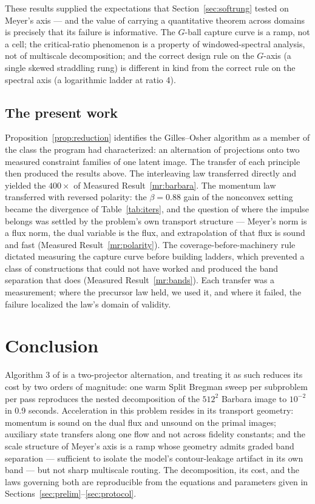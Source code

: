 \documentclass[11pt]{article}
\theoremstyle{definition}
\begin{document}
These results supplied the expectations that Section~\ref{sec:softrung}
tested on Meyer's axis --- and the value of carrying a quantitative theorem
across domains is precisely that its failure is informative. The $G$-ball
capture curve is a ramp, not a cell; the critical-ratio phenomenon is a
property of windowed-spectral analysis, not of multiscale decomposition;
and the correct design rule on the $G$-axis (a single skewed straddling
rung) is different in kind from the correct rule on the spectral axis (a
logarithmic ladder at ratio 4).

\subsection{The present work}

Proposition~\ref{prop:reduction} identifies the Gilles--Osher algorithm as
a member of the class the program had characterized: an alternation of
projections onto two measured constraint families of one latent image. The
transfer of each principle then produced the results above. The
interleaving law transferred directly and yielded the $400\times$ of
Measured Result~\ref{mr:barbara}. The momentum law transferred with
reversed polarity: the $\beta=0.88$ gain of the nonconvex setting became
the divergence of Table~\ref{tab:iters}, and the question of where the
impulse belongs was settled by the problem's own transport structure ---
Meyer's norm is a flux norm, the dual variable is the flux, and
extrapolation of that flux is sound and fast (Measured
Result~\ref{mr:polarity}). The coverage-before-machinery rule dictated
measuring the capture curve before building ladders, which prevented a
class of constructions that could not have worked and produced the band
separation that does (Measured Result~\ref{mr:bands}). Each transfer was a
measurement; where the precursor law held, we used it, and where it failed,
the failure localized the law's domain of validity.

\section{Conclusion}

Algorithm 3 of \cite{gilles} is a two-projector alternation, and treating
it as such reduces its cost by two orders of magnitude: one warm Split
Bregman sweep per subproblem per pass reproduces the nested decomposition
of the $512^2$ Barbara image to $10^{-2}$ in 0.9 seconds. Acceleration in
this problem resides in its transport geometry: momentum is sound on the
dual flux and unsound on the primal images; auxiliary state transfers
along one flow and not across fidelity constants; and the scale structure
of Meyer's axis is a ramp whose geometry admits graded band separation ---
sufficient to isolate the model's contour-leakage artifact in its own band
--- but not sharp multiscale routing. The decomposition, its cost, and the
laws governing both are reproducible from the equations and parameters
given in Sections~\ref{sec:prelim}--\ref{sec:protocol}.
\end{document}
